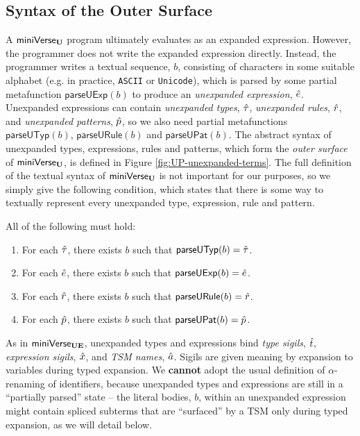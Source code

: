 {{{{\subsection{Syntax of the Outer Surface}\label{sec:syntax-UP}
A $\mathsf{miniVerse}_\textbf{U}$ program ultimately evaluates as an expanded expression. However, the programmer does not write the expanded expression directly. Instead, the programmer writes a textual sequence, $b$, consisting of characters in some suitable alphabet (e.g. in practice, \texttt{ASCII} or \texttt{Unicode}), which is parsed by some partial metafunction $\mathsf{parseUExp}(b)$ to produce an \emph{unex\-panded expression}, ${\hat e}$. Unexpanded expressions can contain \emph{unexpanded types}, ${\hat\tau}$, \emph{unexpanded rules}, $\hat{r}$, and \emph{unexpanded patterns}, $\hat{p}$, so we also need partial metafunctions $\mathsf{parseUTyp}(b)$, $\mathsf{parseURule}(b)$ and $\mathsf{parseUPat}(b)$. The abstract syntax of unexpanded types, expressions, rules and patterns, which form  the \emph{outer surface} of $\mathsf{miniVerse}_\textbf{U}$, is defined in Figure \ref{fig:UP-unexpanded-terms}. The full definition of the textual syntax of $\mathsf{miniVerse}_\textbf{U}$ is not important for our purposes, so we simply give the following condition, which states that there is some way to textually represent every unexpanded type, expression, rule and pattern. %
\begin{condition} All of the following must hold:
\begin{enumerate}
\item For each ${\hat\tau}$, there exists $b$ such that $\mathsf{parseUTyp}(b)={\hat\tau}$. 
\item For each ${\hat e}$, there exists $b$ such that $\mathsf{parseUExp}(b)={\hat e}$.
\item For each $\hat{r}$, there exists $b$ such that $\mathsf{parseURule}(b)=\hat{r}$.
\item For each $\hat{p}$, there exists $b$ such that $\mathsf{parseUPat}(b)=\hat{p}$.
\end{enumerate}
\end{condition}

As in $\mathsf{miniVerse}_\textbf{UE}$, unexpanded types and expressions bind \emph{type sigils}, ${\hat{t}}$, \emph{expression sigils}, ${\hat x}$, and \emph{TSM names}, $\hat{a}$. Sigils are given meaning by expansion to variables during typed expansion. We \textbf{cannot} adopt the usual definition of $\alpha$-renaming of identifiers, because unexpanded types and expressions are still in a ``partially parsed'' state -- the literal bodies, $b$, within an unexpanded expression might contain spliced subterms that are ``surfaced'' by a TSM only during typed expansion, as we will detail below.

}}}}
